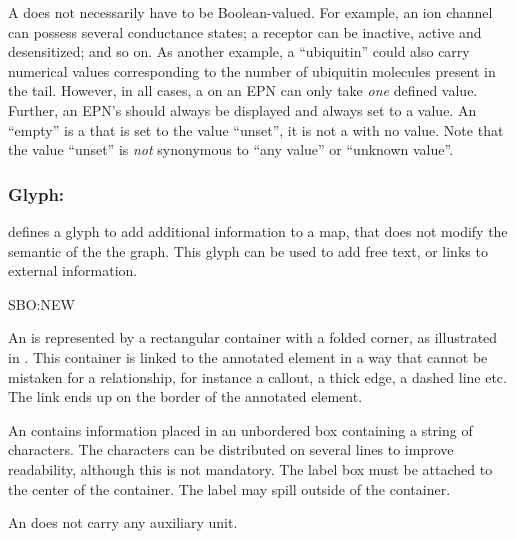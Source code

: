 A  does not necessarily have to be Boolean-valued.  For example, an ion channel can possess several conductance states; a receptor can be inactive, active and desensitized; and so on.  As another example, a  ``ubiquitin'' could also carry numerical values corresponding to the number of ubiquitin molecules present in the tail.  However, in all cases, a  on an EPN can only take \emph{one} defined value.  Further, an EPN's  should always be displayed and always set to a value.  An ``empty''  is a  that is set to the value ``unset'', it is not a  with no value. Note that the value ``unset'' is \emph{not} synonymous to ``any value'' or ``unknown value''.


\subsubsection{Glyph: }

\SBGNPDLone defines a glyph to add additional information to a map, that does not modify the semantic of the the graph. This glyph can be used to add free text, or links to external information.

\begin{glyphDescription}

\glyphSboTerm SBO:NEW

\glyphContainer An  is represented by a rectangular container with a folded corner, as illustrated in . This container is linked to the annotated element in a way that cannot be mistaken for a relationship, for instance a callout, a thick edge, a dashed line etc. The link ends up on the border of the annotated element.

\glyphLabel An  contains information placed in an unbordered box containing a string of characters.  The characters can be distributed on several lines to improve readability, although this is not mandatory.  The label box must be attached to the center of the container. The label may spill outside of the container. 

\glyphAux An  does not carry any auxiliary unit.
\end{glyphDescription}

